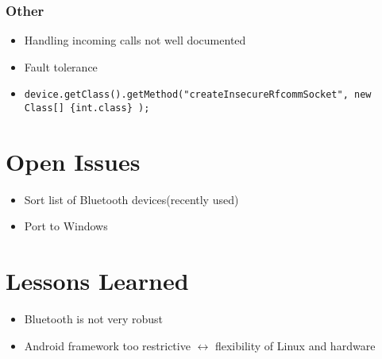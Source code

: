 \documentclass[ddc nogerman]{tudbeamer}
\begin{document}
\begin{frame}
	\frametitle{Other}
	\begin{itemize}
		\item Handling incoming calls not well documented
		\item Fault tolerance
		\item \texttt{device.getClass().getMethod("createInsecureRfcommSocket", new Class[]  \{int.class\} );}
	\end{itemize}
	
\end{frame}

\section{Open Issues}
\begin{frame}
    \begin{itemize}
        \item Sort list of Bluetooth devices(recently used) 
        \item Port to Windows
    \end{itemize}
\end{frame}

\section{Lessons Learned}
\begin{frame}
	\begin{itemize}
		\item Bluetooth is not very robust
		\item Android framework too restrictive  $\longleftrightarrow$ flexibility of Linux and hardware
    \end{itemize}
\end{frame}
\end{document}
